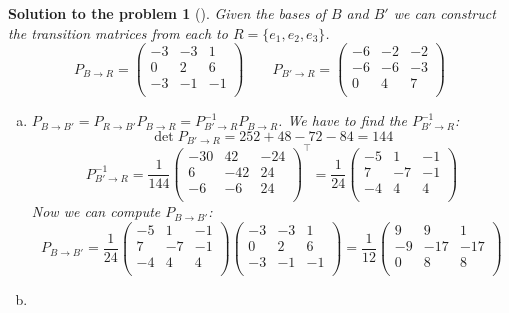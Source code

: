\documentclass[12pt,a4]{article}
\newtheorem{solution}{Solution to the problem}
\begin{document}
\begin{solution}[]\rm
Given the bases of $B$ and $B'$ we can construct the transition matrices from each to $R = \{e_1, e_2, e_3\}$.
\[
P_{B \to R} = 
\begin{pmatrix}
-3 & -3 &  1 \\
0  &  2 &  6 \\
-3 & -1 & -1 \\
\end{pmatrix}
\qquad
P_{B' \to R} = 
\begin{pmatrix}
-6 & -2 & -2 \\
-6 & -6 & -3 \\
 0 &  4 &  7 \\
\end{pmatrix}
\]
\begin{enumerate}[(a)]
\item 
$P_{B \to B'} = P_{R \to B'} P_{B \to R} = P_{B' \to R}^{-1} P_{B \to R}$. We have to find the $P_{B' \to R}^{-1}$:
\[
\det P_{B' \to R} = 252+48-72 - 84 = 144
\]
\[
P_{B' \to R}^{-1} = \frac{1}{144}
\begin{pmatrix}
-30 &  42 & -24 \\
6   & -42 &  24 \\
-6  &  -6 &  24 \\
\end{pmatrix}^\top = \frac{1}{24}
\begin{pmatrix}
-5 &  1 & -1 \\
7  & -7 &  -1 \\
-4  &  4 &  4 \\
\end{pmatrix}
\]
Now we can compute $P_{B \to B'}$:
\[
P_{B \to B'} =  \frac{1}{24}
\begin{pmatrix}
-5 &  1 & -1 \\
7  & -7 &  -1 \\
-4  &  4 &  4 \\
\end{pmatrix}
\begin{pmatrix}
-3 & -3 &  1 \\
0  &  2 &  6 \\
-3 & -1 & -1 \\
\end{pmatrix}
= \frac{1}{12}
\begin{pmatrix}
 9 &  9  &   1 \\
-9 & -17 & -17 \\
 0 &  8  &  8 \\
\end{pmatrix}
\]
\item

\end{enumerate}
\end{solution}
\end{document}

